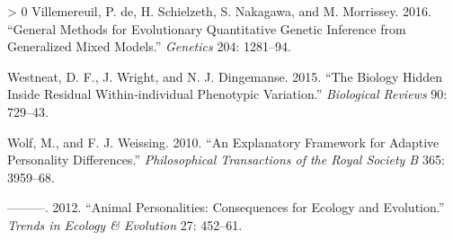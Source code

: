 \documentclass{article}
\newlength{\cslhangindent}
\newenvironment{CSLReferences}[3] %
 {%
  \setlength{\parindent}{0pt}
  \ifodd #1 \everypar{\setlength{\hangindent}{\cslhangindent}}\ignorespaces\fi
  \ifnum #2 > 0
  \setlength{\parskip}{#2\baselineskip}
  \fi
 }%
 {}
\begin{document}
\begin{CSLReferences}{1}{0}
\leavevmode\hypertarget{ref-Vill2016}{}%
Villemereuil, P. de, H. Schielzeth, S. Nakagawa, and M. Morrissey. 2016.
{``General Methods for Evolutionary Quantitative Genetic Inference from
Generalized Mixed Models.''} \emph{Genetics} 204: 1281--94.

\leavevmode\hypertarget{ref-Westneat2015}{}%
Westneat, D. F., J. Wright, and N. J. Dingemanse. 2015. {``The Biology
Hidden Inside Residual Within‐individual Phenotypic Variation.''}
\emph{Biological Reviews} 90: 729--43.

\leavevmode\hypertarget{ref-Wolf2010}{}%
Wolf, M., and F. J. Weissing. 2010. {``An Explanatory Framework for
Adaptive Personality Differences.''} \emph{Philosophical Transactions of
the Royal Society B} 365: 3959--68.

\leavevmode\hypertarget{ref-Wolf2012}{}%
---------. 2012. {``Animal Personalities: Consequences for Ecology and
Evolution.''} \emph{Trends in Ecology \& Evolution} 27: 452--61.

\end{CSLReferences}



\end{document}
